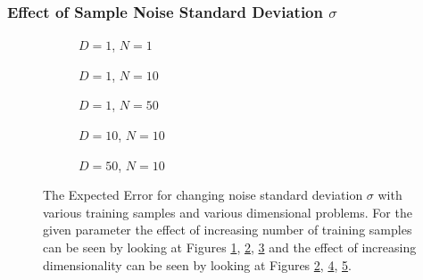 \subsubsection{Effect of Sample Noise Standard Deviation $\sigma$}
\begin{figure}[!h]
  \centering
    \begin{subfigure}{0.3\textwidth}
      \centering
      \caption{$D=1$, $N=1$}
      \label{fig:nonlinear-std_y-N-1-D-1}
    \end{subfigure}
    \begin{subfigure}{0.3\textwidth}
      \centering
      \caption{$D=1$, $N=10$}
      \label{fig:nonlinear-std_y-N-10-D-1}
    \end{subfigure}
    \begin{subfigure}{0.3\textwidth}
      \centering
      \caption{$D=1$, $N=50$}
      \label{fig:nonlinear-std_y-N-50-D-1}
    \end{subfigure}

    \begin{subfigure}{0.3\textwidth}
      \centering
      \caption{$D=10$, $N=10$}
      \label{fig:nonlinear-std_y-N-10-D-10}
    \end{subfigure}
    \begin{subfigure}{0.3\textwidth}
      \centering
      \caption{$D=50$, $N=10$}
      \label{fig:nonlinear-std_y-N-10-D-50}
    \end{subfigure}  

  \caption{The Expected Error for changing noise standard deviation $\sigma$ with various training samples and various dimensional problems. For the given parameter the effect of increasing number of training samples can be seen by looking at Figures \ref{fig:nonlinear-std_y-N-1-D-1}, \ref{fig:nonlinear-std_y-N-10-D-1}, \ref{fig:nonlinear-std_y-N-50-D-1} and the effect of increasing dimensionality can be seen by looking at Figures \ref{fig:nonlinear-std_y-N-10-D-1}, \ref{fig:nonlinear-std_y-N-10-D-10}, \ref{fig:nonlinear-std_y-N-10-D-50}.}\label{fig:nonlinear-std_y}
\end{figure}

